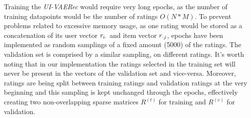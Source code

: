 Training the \emph{UI-VAERec} would require
very long epochs, as the number of training
datapoints would be the number of ratings $O(N*M)$.
To prevent problems related to excessive memory usage,
as one rating would be stored as a concatenation of
its user vector $r_{i\cdot}$ and item vector $r_{\cdot j}$,
epochs have been implemented as random samplings 
of a fixed amount (5000) of the ratings.
The validation set is comprised by a similar sampling, on different ratings.
It's worth noting that in our implementation 
the ratings selected in the training set will never be
present in the vectors of the validation set and vice-versa.
Moreover, ratings are being split between training ratings and validation ratings
at the very beginning and this sampling is kept unchanged through the epochs,
effectively creating two non-overlapping sparse matrices $R^{(t)}$ for training
and $R^{(v)}$ for validation.




